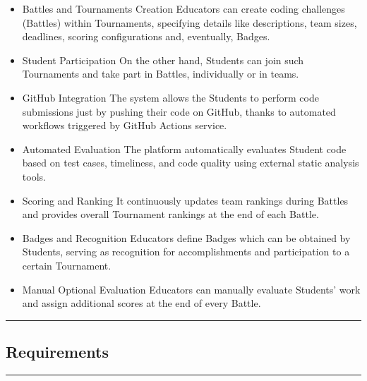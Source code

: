 \documentclass{Configuration_Files/Template}
\begin{document}
\begin{itemize}
\item \textcolor{bluepoli}{Battles and Tournaments Creation} Educators can create coding challenges (Battles) within Tournaments, specifying details like descriptions, team sizes, deadlines, scoring configurations and, eventually, Badges.
\item \textcolor{bluepoli}{Student Participation} On the other hand, Students can join such Tournaments and take part in Battles, individually or in teams. 
\item \textcolor{bluepoli}{GitHub Integration} The system allows the Students to perform code submissions just by pushing their code on GitHub, thanks to automated workflows triggered by GitHub Actions service.
\item \textcolor{bluepoli}{Automated Evaluation} The platform automatically evaluates Student code based on test cases, timeliness, and code quality using external static analysis tools.
\item \textcolor{bluepoli}{Scoring and Ranking} It continuously updates team rankings during Battles and provides overall Tournament rankings at the end of each Battle.
\item \textcolor{bluepoli}{Badges and Recognition} Educators define Badges which can be obtained by Students, serving as recognition for accomplishments and participation to a certain Tournament.
\item \textcolor{bluepoli}{Manual Optional Evaluation} Educators can manually evaluate Students' work and assign additional scores at the end of every Battle.
\end{itemize}

{\color{bluepoli}\rule{\linewidth}{0.1pt}}

\subsection{Requirements}

{\color{bluepoli}\rule{\linewidth}{0.1pt}}
\end{document}
